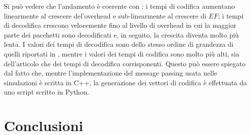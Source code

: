 \documentclass[italian, a4paper, 12pt]{article}
\begin{document}
%
Si può vedere che l'andamento è coerente con \cite{uep}: i tempi di
codifica aumentano linearmente al crescere del'overhead e
sub-linearmente al crescere di $EF$; i tempi di decodifica crescono
velocemente fino al livello di overhead in cui la maggior parte dei
pacchetti sono decodificati e, in seguito, la crescita diventa molto
più lenta.
%
I valori dei tempi di decodifica sono dello stesso ordine di grandezza
di quelli riportati in \cite{uep}, mentre i valori dei tempi di
codifica sono molto più alti, sia dell'articolo che dei tempi di
decodifica corrisponenti. Questo può essere spiegato dal fatto che,
mentre l'implementazione del message passing usata nelle simulazioni è
scritta in C++, la generazione dei vettori di codifica è effettuata da
uno script scritto in Python.

\newpage
\section{Conclusioni} %



\printbibliography[heading=bibnumbered, title=Bibliografia]
\end{document}
